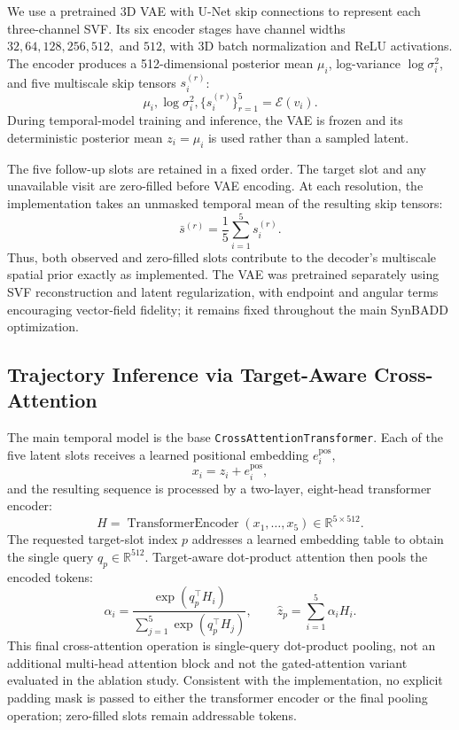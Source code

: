 We use a pretrained 3D VAE with U-Net skip connections to represent each three-channel SVF. Its six encoder stages have channel widths $32,64,128,256,512,$ and $512$, with 3D batch normalization and ReLU activations. The encoder produces a 512-dimensional posterior mean $\mu_i$, log-variance $\log\sigma_i^2$, and five multiscale skip tensors $s_i^{(r)}$:
\begin{equation}
    \mu_i,\log\sigma_i^2,\{s_i^{(r)}\}_{r=1}^{5}=\mathcal{E}(v_i).
\end{equation}
During temporal-model training and inference, the VAE is frozen and its deterministic posterior mean $z_i=\mu_i$ is used rather than a sampled latent.

The five follow-up slots are retained in a fixed order. The target slot and any unavailable visit are zero-filled before VAE encoding. At each resolution, the implementation takes an unmasked temporal mean of the resulting skip tensors:
\begin{equation}
    \bar s^{(r)}=\frac{1}{5}\sum_{i=1}^{5}s_i^{(r)}.
\end{equation}
Thus, both observed and zero-filled slots contribute to the decoder's multiscale spatial prior exactly as implemented. The VAE was pretrained separately using SVF reconstruction and latent regularization, with endpoint and angular terms encouraging vector-field fidelity; it remains fixed throughout the main SynBADD optimization.

\subsection{Trajectory Inference via Target-Aware Cross-Attention}

The main temporal model is the base \texttt{CrossAttentionTransformer}. Each of the five latent slots receives a learned positional embedding $e_i^{\mathrm{pos}}$,
\begin{equation}
    x_i=z_i+e_i^{\mathrm{pos}},
\end{equation}
and the resulting sequence is processed by a two-layer, eight-head transformer encoder:
\begin{equation}
    H=\operatorname{TransformerEncoder}(x_1,\ldots,x_5)
    \in\mathbb{R}^{5\times512}.
\end{equation}
The requested target-slot index $p$ addresses a learned embedding table to obtain the single query $q_p\in\mathbb{R}^{512}$. Target-aware dot-product attention then pools the encoded tokens:
\begin{equation}
    \alpha_i=\frac{\exp(q_p^\top H_i)}{\sum_{j=1}^{5}\exp(q_p^\top H_j)},
    \qquad
    \hat z_p=\sum_{i=1}^{5}\alpha_iH_i.
\end{equation}
This final cross-attention operation is single-query dot-product pooling, not an additional multi-head attention block and not the gated-attention variant evaluated in the ablation study. Consistent with the implementation, no explicit padding mask is passed to either the transformer encoder or the final pooling operation; zero-filled slots remain addressable tokens.

